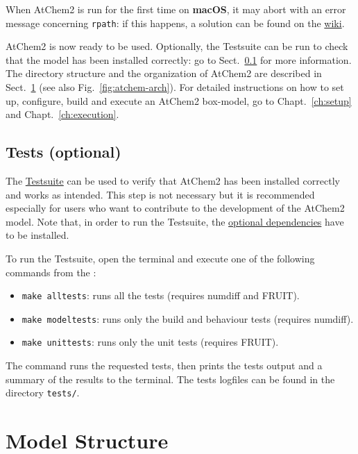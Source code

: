 When AtChem2 is run for the first time on \textbf{macOS}, it may abort
with an error message concerning \texttt{rpath}: if this happens,
a solution can be found on the
\href{https://github.com/AtChem/AtChem2/wiki/Known-Issues}{wiki}.

AtChem2 is now ready to be used. Optionally, the Testsuite can be run
to check that the model has been installed correctly: go to
Sect.~\ref{subsec:tests-optional} for more information. The directory
structure and the organization of AtChem2 are described in
Sect.~\ref{sec:model-structure} (see also Fig.~\ref{fig:atchem-arch}).
For detailed instructions on how to set up, configure, build and
execute an AtChem2 box-model, go to Chapt.~\ref{ch:setup} and
Chapt.~\ref{ch:execution}.

\subsection{Tests (optional)} \label{subsec:tests-optional}

The \hyperref[sec:test-suite]{Testsuite} can be used to verify that
AtChem2 has been installed correctly and works as intended. This step
is not necessary but it is recommended especially for users who want
to contribute to the development of the AtChem2 model.
Note that, in order to run the Testsuite, the
\hyperref[subsec:optional-dependencies]{optional dependencies} have to
be installed.

To run the Testsuite, open the terminal and execute one of the
following commands from the \maindir:

\begin{itemize}
\item \verb|make alltests|: runs all the tests (requires numdiff and
  FRUIT).
\item \verb|make modeltests|: runs only the build and behaviour tests
  (requires numdiff).
\item \verb|make unittests|: runs only the unit tests (requires
  FRUIT).
\end{itemize}

The command runs the requested tests, then prints the tests output and
a summary of the results to the terminal. The tests logfiles can be
found in the directory \texttt{tests/}.

\section{Model Structure} \label{sec:model-structure}

